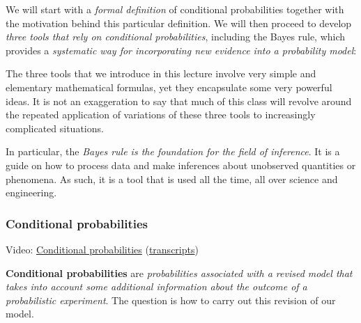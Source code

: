 \documentclass[pdftex, brazil, 12pt, twoside]{article}
\begin{document}
We will start with a \emph{formal definition} of conditional
probabilities together with the motivation behind this
particular definition.
We will then proceed to develop \emph{three tools that rely
on conditional probabilities}, including the Bayes rule,
which provides a \emph{systematic way for incorporating new
evidence into a probability model}:

\begin{figure}[H]
  \begin{center}
  \end{center}
\end{figure}

The three tools that we introduce in this lecture
involve very simple and elementary mathematical
formulas, yet they encapsulate some very powerful ideas.
It is not an exaggeration to say that much of this class
will revolve around the repeated application of
variations of these three tools to increasingly
complicated situations.

In particular, the \emph{Bayes rule is the foundation for the
field of inference}.
It is a guide on how to process data and make
inferences about unobserved quantities or phenomena.
As such, it is a tool that is used all the time, all over
science and engineering.

\subsubsection{Conditional probabilities}
\label{un2-lec2-cond-prob}

Video: \href{https://www.youtube.com/watch?v=Ixse7rx8Vf0}{Conditional probabilities}
(\href{Unit-2/01\_lecture\_2/l02\_2\_transcripts.pdf}{transcripts})

\textbf{Conditional probabilities} are \emph{probabilities associated with
a revised model that takes into account some additional
information about the outcome of a probabilistic experiment}.
The question is how to carry out this
revision of our model.
\end{document}

